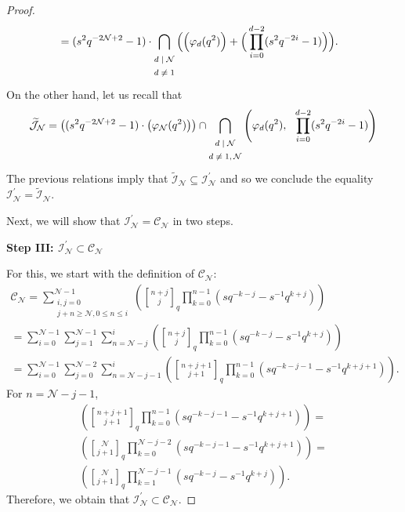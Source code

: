 \documentclass[10pt,a4paper]{amsart}
\newcommand{\cC}{\mathcal{C}}
\newcommand{\cI}{\mathcal{I}}
\newcommand{\cJ}{\mathcal{J}}
\newcommand{\cN}{\mathcal{N}}
\renewcommand{\geq}{\geqslant}
\renewcommand{\leq}{\leqslant}
\begin{document}
\begin{proof}
\begin{equation*}
\begin{aligned}
 &=(s^2 q^{-2\cN+2}-1) \cdot \bigcap_{\text{\scriptsize$\begin{matrix}
 d\mid \cN \\ d \neq 1 \end{matrix}$}} \Big(\Big( \varphi_d(q^2)\Big) +
  \Big(\prod_{i=0}^{d-2}(s^2q^{-2i}-1) \Big) \Big).
 \end{aligned}
\end{equation*} 
On the other hand, let us recall that 
\begin{equation*}
\widetilde{\cJ}_\cN =   
\left((s^2 q^{-2\cN+2} - 1) \cdot\left(\varphi_\cN(q^2)\right)\right) \cap
 \bigcap_{\text{\scriptsize$\begin{matrix}
 d\mid \cN \\ d \neq 1, \cN \end{matrix}$}}
 \left(\varphi_d(q^2),\ \  \prod_{i=0}^{d-2}(s^2q^{-2i}-1) \right)
\end{equation*}
%
The previous relations imply that $\widetilde{\cI}_\cN \subseteq \cI_\cN^\prime$ and so we conclude the equality $\cI_\cN^\prime = \widetilde{\cI}_\cN$.  
%
%
\par
Next, we will show that $\cI_{\cN}^\prime = \cC_{\cN}$ in two steps.
%
\par
{\bf Step III: $\cI_{\cN}^\prime \subset \cC_{\cN}$ } 
\par
For this, we start with the definition of $\cC_\cN$:
\begin{multline*}
\cC_\cN= \sum_{\substack{i,j=0 \\ j+n\geq \cN,0\leq  n\leq i}}^{\cN-1}
 \left( {n+j \brack j}_q \prod_{k=0}^{n-1}(sq^{-k-j}-s^{-1}q^{k+j}) \right) 
 \\
 =
 \sum_{i=0}^{\cN-1}
 \sum_{j=1}^{\cN-1}
 \sum_{n=\cN-j}^{i}
 \left( {n+j \brack j}_q \prod_{k=0}^{n-1}(sq^{-k-j}-s^{-1}q^{k+j}) \right) 
 \\=
 \sum_{i=0}^{\cN-1}
 \sum_{j=0}^{\cN-2}
 \sum_{n=\cN-j-1}^{i}
 \left( {n+j+1 \brack j+1}_q \prod_{k=0}^{n-1}(sq^{-k-j-1}-s^{-1}q^{k+j+1}) \right).  
\end{multline*}
For $n=\cN-j-1$, 
\begin{multline*}
 \left( {n+j+1 \brack j+1}_q \prod_{k=0}^{n-1}(sq^{-k-j-1}-s^{-1}q^{k+j+1}) \right)  
 =
 \\
  \left( {\cN \brack j+1}_q \prod_{k=0}^{\cN-j-2}(sq^{-k-j-1}-s^{-1}q^{k+j+1}) \right)  
  =
  \\
   \left( {\cN \brack j+1}_q \prod_{k=1}^{\cN-j-1}(sq^{-k-j}-s^{-1}q^{k+j}) \right).
\end{multline*}
Therefore, we obtain that $\cI_{\cN}^\prime \subset \cC_{\cN}$.  

\end{proof}
\end{document}
